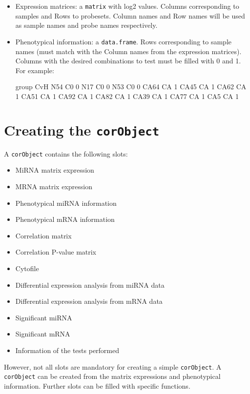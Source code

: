 \documentclass{article}
\begin{document}
\begin{itemize}
\item Expression matrices: a \texttt{matrix} with log2 values. Columns corresponding to samples and Rows to probesets. Column names and Row names will be used as sample names and probe names respectively.
\item Phenotypical information: a \texttt{data.frame}. Rows corresponding to sample names (must match with the Column names from the expression matrices). Columns with the desired combinations to test must be filled with 0 and 1. For example: 
\begin{Schunk}
\begin{Soutput}
     group CvH
N54     C0   0
N17     C0   0
N53     C0   0
CA64    CA   1
CA45    CA   1
CA62    CA   1
CA51    CA   1
CA92    CA   1
CA82    CA   1
CA39    CA   1
CA77    CA   1
CA5     CA   1
\end{Soutput}
\end{Schunk}

\end{itemize}

\section{Creating the \texttt{corObject}}
A \texttt{corObject} contains the following slots:
\begin{itemize}
\item MiRNA matrix expression
\item MRNA matrix expression
\item Phenotypical miRNA information
\item Phenotypical mRNA information
\item Correlation matrix
\item Correlation P-value matrix
\item Cytofile
\item Differential expression analysis from miRNA data
\item Differential expression analysis from mRNA data
\item Significant miRNA
\item Significant mRNA
\item Information of the tests performed
\end{itemize}

However, not all slots are mandatory for creating a simple \texttt{corObject}. A \texttt{corObject} can be created from the matrix expressions and phenotypical information. Further slots can be filled with specific functions.
\end{document}
